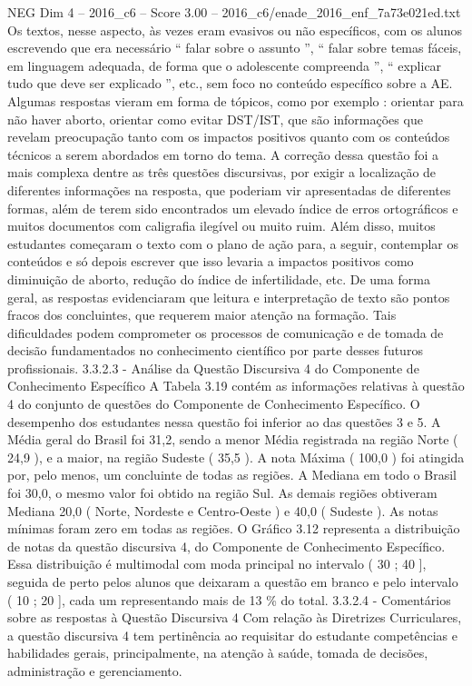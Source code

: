 \begin{textsample}{NEG Dim 4 – 2016\_c6 – Score 3.00 – 2016\_c6/enade\_2016\_enf\_7a73e021ed.txt}
Os textos, nesse aspecto, às vezes eram evasivos ou não específicos, com os alunos escrevendo que era necessário “ falar sobre o assunto ”, “ falar sobre temas fáceis, em linguagem adequada, de forma que o adolescente compreenda ”, “ explicar tudo que deve ser explicado ”, etc., sem foco no conteúdo específico sobre a AE.
Algumas respostas vieram em forma de tópicos, como por exemplo : orientar para não haver aborto, orientar como evitar DST/IST, que são informações que revelam preocupação tanto com os impactos positivos quanto com os conteúdos técnicos a serem abordados em torno do tema.
A correção dessa questão foi a mais complexa dentre as três questões discursivas, por exigir a localização de diferentes informações na resposta, que poderiam vir apresentadas de diferentes formas, além de terem sido encontrados um elevado índice de erros ortográficos e muitos documentos com caligrafia ilegível ou muito ruim.
Além disso, muitos estudantes começaram o texto com o plano de ação para, a seguir, contemplar os conteúdos e só depois escrever que isso levaria a impactos positivos como diminuição de aborto, redução do índice de infertilidade, etc.
De uma forma geral, as respostas evidenciaram que leitura e interpretação de texto são pontos fracos dos concluintes, que requerem maior atenção na formação.
Tais dificuldades podem comprometer os processos de comunicação e de tomada de decisão fundamentados no conhecimento científico por parte desses futuros profissionais. 3.3.2.3 - Análise da Questão Discursiva 4 do Componente de Conhecimento Específico A Tabela 3.19 contém as informações relativas à questão 4 do conjunto de questões do Componente de Conhecimento Específico.
O desempenho dos estudantes nessa questão foi inferior ao das questões 3 e 5.
A Média geral do Brasil foi 31,2, sendo a menor Média registrada na região Norte ( 24,9 ), e a maior, na região Sudeste ( 35,5 ).
A nota Máxima ( 100,0 ) foi atingida por, pelo menos, um concluinte de todas as regiões.
A Mediana em todo o Brasil foi 30,0, o mesmo valor foi obtido na região Sul.
As demais regiões obtiveram Mediana 20,0 ( Norte, Nordeste e Centro-Oeste ) e 40,0 ( Sudeste ).
As notas mínimas foram zero em todas as regiões.
O Gráfico 3.12 representa a distribuição de notas da questão discursiva 4, do Componente de Conhecimento Específico.
Essa distribuição é multimodal com moda principal no intervalo ( 30 ; 40 ], seguida de perto pelos alunos que deixaram a questão em branco e pelo intervalo ( 10 ; 20 ], cada um representando mais de 13 \% do total. 3.3.2.4 - Comentários sobre as respostas à Questão Discursiva 4 Com relação às Diretrizes Curriculares, a questão discursiva 4 tem pertinência ao requisitar do estudante competências e habilidades gerais, principalmente, na atenção à saúde, tomada de decisões, administração e gerenciamento.

\end{textsample}
